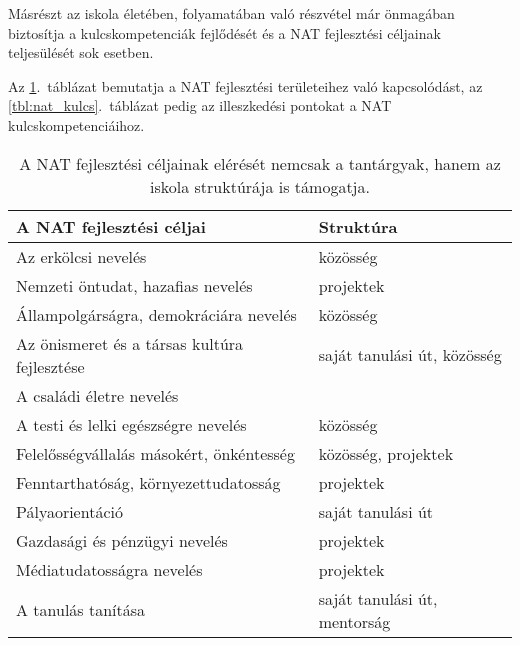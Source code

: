 Másrészt az iskola életében, folyamatában való részvétel már önmagában
biztosítja a kulcskompetenciák fejlődését és a NAT fejlesztési céljainak
teljesülését sok esetben.

Az \ref{tbl:nat_fejlesztesi}.~táblázat bemutatja a NAT fejlesztési területeihez
való kapcsolódást, az
\ref{tbl:nat_kulcs}.~táblázat pedig az illeszkedési pontokat a NAT
kulcskompetenciáihoz.

\begin{table}
    \centering
  \begin{tabular}{p{5cm}|p{3cm}}

    \textbf{A NAT fejlesztési céljai}             & \textbf{Struktúra}           \\
    \hline
    Az erkölcsi nevelés                           & közösség                     \\ \hline
    Nemzeti öntudat, hazafias nevelés             & projektek                    \\ \hline
    Állampolgárságra, demokráciára nevelés        & közösség                     \\ \hline
    Az önismeret és a társas kultúra fejlesztése  & saját tanulási út, közösség  \\ \hline
    A családi életre nevelés                      &                              \\ \hline
    A testi és lelki egészségre nevelés           & közösség                     \\ \hline
    Felelősségvállalás másokért, önkéntesség      & közösség, pro\-jek\-tek      \\
    \hline
    Fenntarthatóság, környezettudatosság          & projektek                    \\ \hline
    Pályaorientáció                               & saját tanulási út            \\ \hline
    Gazdasági és pénzügyi nevelés                 & projektek                    \\ \hline
    Médiatudatosságra nevelés                     & projektek                    \\ \hline
    A tanulás tanítása                            & saját tanulási út, mentorság \\

  \end{tabular}
  \caption{A NAT fejlesztési céljainak elérését nemcsak a tantárgyak, hanem az
    iskola struktúrája is támogatja.}
  \label{tbl:nat_fejlesztesi}
\end{table}

